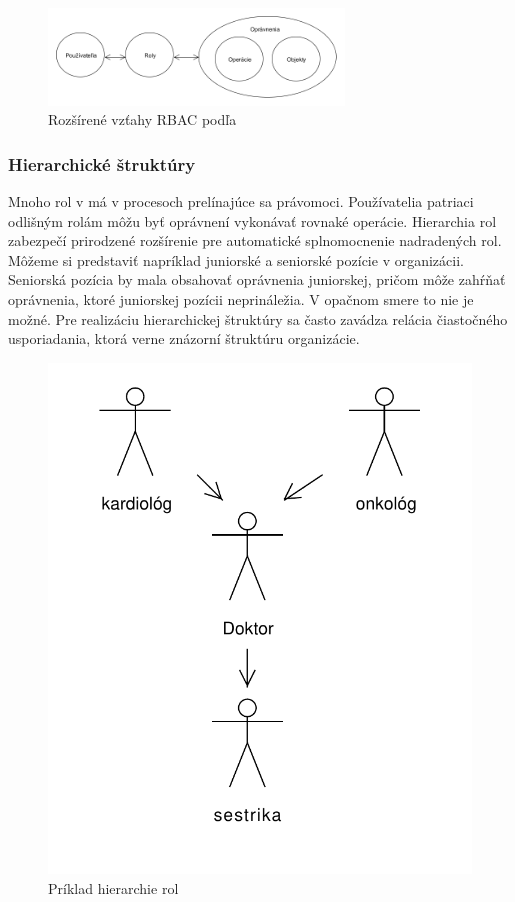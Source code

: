 \begin{figure}[h]
	\centerline{\includegraphics[width=0.7\textwidth]{images/rbac_kuhn_full}}
	\caption{Rozšírené vzťahy RBAC podľa \cite{kuhn}}
	\label{obr:rbac_kuhn_full}
\end{figure}



\subsubsection{Hierarchické štruktúry}
Mnoho rol v má v procesoch prelínajúce sa právomoci. Používatelia patriaci odlišným rolám môžu byť oprávnení vykonávať rovnaké operácie. Hierarchia rol zabezpečí prirodzené rozšírenie pre automatické splnomocnenie nadradených rol. Môžeme si predstaviť napríklad juniorské a seniorské pozície v organizácii. Seniorská pozícia by mala obsahovať oprávnenia juniorskej, pričom môže zahŕňať oprávnenia, ktoré juniorskej pozícii neprináležia.   V opačnom smere to nie je možné.  Pre realizáciu hierarchickej štruktúry sa často zavádza relácia čiastočného usporiadania, ktorá verne znázorní štruktúru organizácie. 

\begin{figure}[h]
	\centerline{\includegraphics[height=0.45\textwidth]{images/hierarchia_priklad}}
	\caption{Príklad hierarchie rol}
	\label{obr:rbac_hierarchy}
\end{figure}






